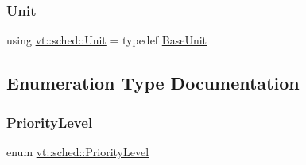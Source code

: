 \mbox{\label{namespacevt_1_1sched_a3f19a4714fc5d9f901b45665a9d794d5}} 
\subsubsection{\texorpdfstring{Unit}{Unit}}
{\footnotesize\ttfamily using \hyperlink{namespacevt_1_1sched_a3f19a4714fc5d9f901b45665a9d794d5}{vt\+::sched\+::\+Unit} = typedef \hyperlink{structvt_1_1sched_1_1_base_unit}{Base\+Unit}}



\subsection{Enumeration Type Documentation}
\mbox{\label{namespacevt_1_1sched_a2857a110a140d0a9f77d374c90eb498b}} 
\subsubsection{\texorpdfstring{Priority\+Level}{PriorityLevel}}
{\footnotesize\ttfamily enum \hyperlink{namespacevt_1_1sched_a2857a110a140d0a9f77d374c90eb498b}{vt\+::sched\+::\+Priority\+Level}}

